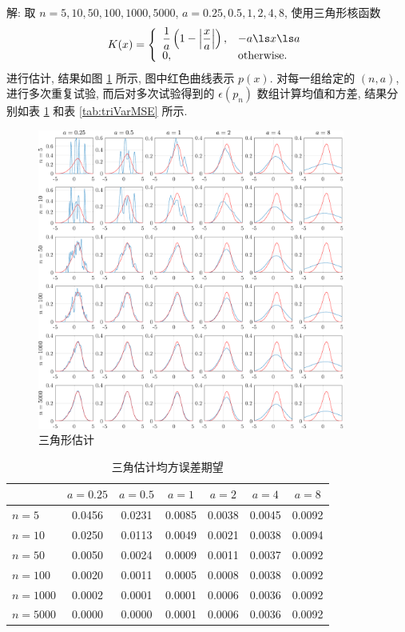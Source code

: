 \documentclass[openany]{ctexbook}
\theoremstyle{kaiti}
\theoremstyle{normal}
\begin{document}
解: 取 $n=5,10,50,100,1000,5000$, $a=0.25,0.5,1,2,4,8$, 使用三角形核函数
\begin{equation}
  K(x)=
  \left\{
    \begin{array}{ll}
      \dfrac{1}{a}\left(1-\left\lvert\dfrac{x}{a} \right\rvert\right),&-a\ls x\ls a \\
      0, & \text{otherwise.}
    \end{array}
  \right.
\end{equation}
进行估计, 结果如图 \ref{fig:triwin} 所示, 图中红色曲线表示 $p(x)$. 对每一组给定的 $(n,a)$, 进行多次重复试验, 而后对多次试验得到的 $\epsilon(p_n)$ 数组计算均值和方差, 结果分别如表 \ref{tab:triMeanMSE} 和表 \ref{tab:triVarMSE} 所示.

\begin{figure}[htbp]
  \centering
  \includegraphics[width=0.9\textwidth]{triangularWindow.pdf}
  \caption{三角形估计}
  \label{fig:triwin}
\end{figure}

\begin{table}[htbp]
  \centering
  \begin{tabular}{l|cccccc}
  \hline
           & $a=0.25$ & $a=0.5$ & $a=1$  & $a=2$  & $a=4$  & $a=8$  \\ \hline
  $n=5$    & 0.0456   & 0.0231  & 0.0085 & 0.0038 & 0.0045 & 0.0092 \\
  $n=10$   & 0.0250   & 0.0113  & 0.0049 & 0.0021 & 0.0038 & 0.0094 \\
  $n=50$   & 0.0050   & 0.0024  & 0.0009 & 0.0011 & 0.0037 & 0.0092 \\
  $n=100$  & 0.0020   & 0.0011  & 0.0005 & 0.0008 & 0.0038 & 0.0092 \\
  $n=1000$ & 0.0002   & 0.0001  & 0.0001 & 0.0006 & 0.0036 & 0.0092 \\
  $n=5000$ & 0.0000   & 0.0000  & 0.0001 & 0.0006 & 0.0036 & 0.0092 \\ \hline
  \end{tabular}
  \caption{三角估计均方误差期望}
  \label{tab:triMeanMSE}
\end{table}
\end{document}
